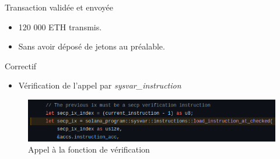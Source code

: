 \begin{frame}
    \begin{block}{Transaction validée et envoyée}
        \begin{itemize}
            \item 120 000 ETH transmis.
            \item Sans avoir déposé de jetons au préalable.
        \end{itemize}
    \end{block}
\end{frame}

\begin{frame}{Correctif}
    \begin{itemize}
        \item Vérification de l'appel par \textit{sysvar\_instruction}
    \end{itemize}
    \begin{figure}
        \centering
        \includegraphics[scale = 0.3]{centralisation/img/worm_fixed.png}
        \caption{Appel à la fonction de vérification}
    \end{figure}
\end{frame}



